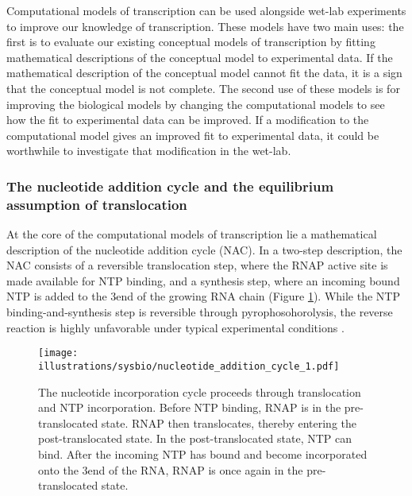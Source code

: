 %
Computational models of transcription can be used alongside wet-lab experiments
to improve our knowledge of transcription. These models have two main uses: the
first is to evaluate our existing conceptual models of transcription by fitting
mathematical descriptions of the conceptual model to experimental data. If the
mathematical description of the conceptual model cannot fit the data, it is a
sign that the conceptual model is not complete. The second use of these models
is for improving the biological models by changing the computational models to
see how the fit to experimental data can be improved. If a modification to the
computational model gives an improved fit to experimental data, it could be
worthwhile to investigate that modification in the wet-lab.

\subsubsection{The nucleotide addition cycle and the equilibrium assumption of
translocation}
At the core of the computational models of transcription lie a mathematical
description of the nucleotide addition cycle (NAC). In a two-step description,
the NAC consists of a reversible translocation step, where the RNAP active site
is made available for NTP binding, and a synthesis step, where an incoming
bound NTP is added to the 3\ppp end of the growing RNA chain (Figure
\ref{fig:nac_1}). While the NTP binding-and-synthesis step is reversible
through pyrophosohorolysis, the reverse reaction is highly unfavorable under
typical experimental conditions \cite{buc_chapter_2009}.
\begin{figure}[htb]
	\begin{center}
		\texttt{[image: illustrations/sysbio/nucleotide\_addition\_cycle\_1.pdf]}
	\end{center}
	\caption{The nucleotide incorporation cycle proceeds through
	translocation and NTP incorporation. Before NTP binding, RNAP is in the
	pre-translocated state. RNAP then translocates, thereby entering the
	post-translocated state. In the post-translocated state, NTP can bind.
    After the incoming NTP has bound and become incorporated onto the
    3\protect\ppp end of the RNA, RNAP is once again in the pre-translocated
    state.}
	\label{fig:nac_1}
\end{figure}


